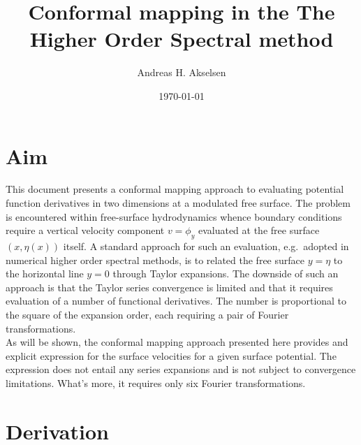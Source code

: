 \documentclass[a4paper,12pt]{article}
\renewcommand{\_}[1]{_\mr{#1}}
\newcommand{\x}{x}
\newcommand{\y}{y}
\newcommand{\surf}{\eta}
\begin{document}
\title{Conformal mapping in the The Higher Order Spectral method}
\author{Andreas H. Akselsen}
\date{\today}
\maketitle


\section{Aim}
This document presents a conformal mapping approach to evaluating potential function derivatives in two dimensions at a modulated free surface.
The problem is encountered within free-surface hydrodynamics whence boundary conditions require a vertical velocity component $v=\phi_y$ evaluated at the free surface $(\x,\surf(\x))$ itself.
A standard approach for such an evaluation, e.g.\ adopted in numerical higher order spectral methods, is to related the free surface $\y=\surf$ to the horizontal line $\y=0$ through Taylor expansions.
The downside of such an approach is that the Taylor series convergence is limited \citep{west1981deep} and that it requires evaluation of a number of functional derivatives.
The number is proportional to the square of the expansion order, each requiring a pair of Fourier transformations.
\\

As will be shown, the conformal mapping approach presented here provides and explicit expression for the surface velocities for a given surface potential.
The expression does not entail any series expansions and is not subject to convergence limitations.
What's more, it requires only six Fourier transformations.

\section{Derivation}
\end{document}
